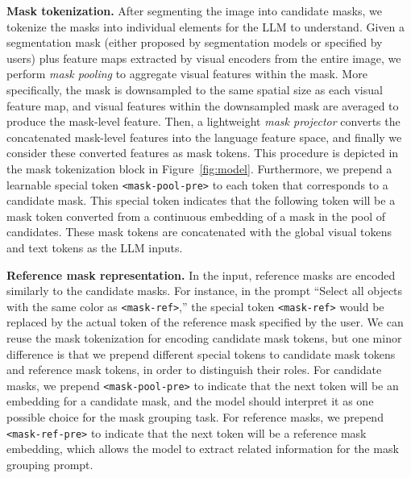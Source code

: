 \noindent\textbf{Mask tokenization.} After segmenting the image into candidate masks, we tokenize the masks into individual elements for the LLM to understand. Given a segmentation mask (either proposed by segmentation models or specified by users) plus feature maps extracted by visual encoders from the entire image, we perform \emph{mask pooling} to aggregate visual features within the mask. More specifically, the mask is downsampled to the same spatial size as each visual feature map, and visual features within the downsampled mask are averaged to produce the mask-level feature. Then, a lightweight \emph{mask projector} converts the concatenated mask-level features into the language feature space, and finally we consider these converted features as mask tokens. This procedure is depicted in the mask tokenization block in Figure~\ref{fig:model}. Furthermore, we prepend a learnable special token \texttt{\textless mask-pool-pre\textgreater} to each token that corresponds to a candidate mask. This special token indicates that the following token will be a mask token converted from a continuous embedding of a mask in the pool of candidates. These mask tokens are concatenated with the global visual tokens and text tokens as the LLM inputs.

\noindent\textbf{Reference mask representation.} In the input, reference masks are encoded similarly to the candidate masks. For instance, in the prompt ``Select all objects with the same color as \texttt{\textless mask-ref\textgreater},'' the special token \texttt{\textless mask-ref\textgreater} would be replaced by the actual token of the reference mask specified by the user. We can reuse the mask tokenization for encoding candidate mask tokens, but one minor difference is that we prepend different special tokens to candidate mask tokens and reference mask tokens, in order to distinguish their roles. For candidate masks, we prepend \texttt{\textless mask-pool-pre\textgreater} to indicate that the next token will be an embedding for a candidate mask, and the model should interpret it as one possible choice for the mask grouping task. For reference masks, we prepend \texttt{\textless mask-ref-pre\textgreater} to indicate that the next token will be a reference mask embedding, which allows the model to extract related information for the mask grouping prompt.

